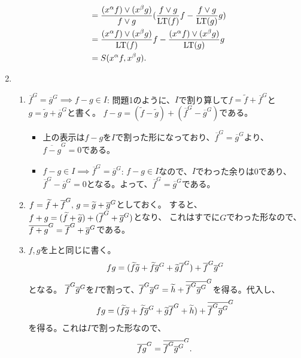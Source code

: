 \begin{enumerate}[label=(問題 \arabic*)]
\begin{align}
    &=
    \frac{(x^\alpha f)\vee (x^\beta g)}{f \vee g} (\frac{f\vee g}{{\rm LT}(f)}f - \frac{f\vee g}{{\rm LT}(g)}g)\\
    &=
    \frac{(x^\alpha f)\vee(x^\beta g)}{{\rm LT}(f)}f - \frac{(x^\alpha f)\vee (x^\beta g)}{{\rm LT}(g)}g\\
    &=
    S(x^\alpha f, x^\beta g).
  \end{align}
  \item
  \begin{enumerate}[label=(\alph*)]
    \item
    $\overline f^G = \overline g^G \implies f-g\in I$:
    問題1のように、$I$で割り算して$f=\tilde f + \overline f^G$と
    $g=\tilde g + \overline g^G$と書く。
    $f-g = (\tilde f - \tilde g ) + (\overline f^G - \overline g^G)$である。
    \begin{itemize}
      \item
      上の表示は$f-g$を$I$で割った形になっており、$\overline f^G =\overline g^G$より、
      $\overline{f-g}^G = 0$である。
      \item $f-g\in I \implies \overline f^G = \overline g^G$:
      $f-g\in I$なので、$I$でわった余りは0であり、$\overline f^G - \overline g^G = 0$となる。よって、$\overline f^G = \overline g^G$である。
    \end{itemize}
    \item $f=\widetilde f + \overline{f}^{G},\, g=\widetilde g + \overline{g}^{G}$としておく。
    すると、$f+g = (\widetilde f + \widetilde g) + (\overline{f}^{G} + \overline{g}^{G})$となり、
    これはすでに$G$でわった形なので、$\overline{f+g}^{G} = \overline{f}^{G} + \overline{g}^{G}$である。
    \item
    $f,g$を上と同じに書く。
    \begin{align}
      fg = (\widetilde f \widetilde g + \widetilde f \overline{g}^{G} + \widetilde g \overline{f}^{G}) + \overline{f}^{G}\overline{g}^{G}
    \end{align}
    となる。
    $\overline{f}^{G}\overline{g}^{G}$を$I$で割って、$\overline{f}^{G}\overline{g}^{G} = \widetilde h + \overline{\overline{f}^{G}\overline{g}^{G}}^{G}$を得る。代入し、
    \begin{align}
      fg = (\widetilde f \widetilde g + \widetilde f \overline{g}^{G} + \widetilde g \overline{f}^{G} + \widetilde h) + \overline{\overline{f}^{G}\overline{g}^{G}}^{G}
    \end{align}
    を得る。これは$I$で割った形なので、
    \begin{align}
      \overline{fg}^{G} = \overline{\overline{f}^{G} \overline{g}^{G}}^{G}.
    \end{align}
  \end{enumerate}
\end{enumerate}

